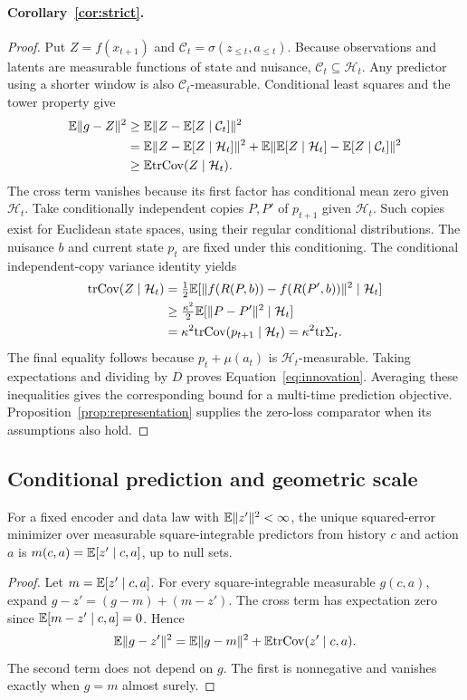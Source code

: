 \paragraph{Corollary~\ref{cor:strict}.}
\begin{proof}
Put $Z=f(x_{t+1})$ and $\mathcal C_t=\sigma(z_{\le t},a_{\le t})$.
Because observations and latents are measurable functions of state and nuisance, $\mathcal C_t\subseteq\mathcal H_t$.
Any predictor using a shorter window is also $\mathcal C_t$-measurable.
Conditional least squares and the tower property give
\begin{align*}
\mathbb{E}\|g-Z\|^2
&\ge\mathbb{E}\|Z-\mathbb{E}[Z\mid\mathcal C_t]\|^2\\
&=\mathbb{E}\|Z-\mathbb{E}[Z\mid\mathcal H_t]\|^2
 +\mathbb{E}\|\mathbb{E}[Z\mid\mathcal H_t]-\mathbb{E}[Z\mid\mathcal C_t]\|^2\\
&\ge\mathbb{E}\mathrm{tr}\mathrm{Cov}(Z\mid\mathcal H_t).
\end{align*}
The cross term vanishes because its first factor has conditional mean zero given $\mathcal H_t$.
Take conditionally independent copies $P,P'$ of $p_{t+1}$ given $\mathcal H_t$.
Such copies exist for Euclidean state spaces, using their regular conditional distributions.
The nuisance $b$ and current state $p_t$ are fixed under this conditioning.
The conditional independent-copy variance identity yields
\begin{align*}
\mathrm{tr}\mathrm{Cov}(Z\mid\mathcal H_t)
&=\tfrac12\mathbb{E}[\|f(R(P,b))-f(R(P',b))\|^2\mid\mathcal H_t]\\
&\ge\tfrac{\kappa^2}{2}\mathbb{E}[\|P-P'\|^2\mid\mathcal H_t]\\
&=\kappa^2\mathrm{tr}\mathrm{Cov}(p_{t+1}\mid\mathcal H_t)
=\kappa^2\mathrm{tr}\Sigma_t.
\end{align*}
The final equality follows because $p_t+\mu(a_t)$ is $\mathcal H_t$-measurable.
Taking expectations and dividing by $D$ proves Equation~\ref{eq:innovation}.
Averaging these inequalities gives the corresponding bound for a multi-time prediction objective.
Proposition~\ref{prop:representation} supplies the zero-loss comparator when its assumptions also hold.
\end{proof}

\subsection{Conditional prediction and geometric scale}
\begin{lemma}
\label{lem:mean}
For a fixed encoder and data law with $\mathbb{E}\|z'\|^2<\infty$, the unique squared-error minimizer
over measurable square-integrable predictors from history $c$ and action $a$ is
$m(c,a)=\mathbb{E}[z'\mid c,a]$, up to null sets.
\end{lemma}
\begin{proof}
Let $m=\mathbb{E}[z'\mid c,a]$.
For every square-integrable measurable $g(c,a)$, expand $g-z'=(g-m)+(m-z')$.
The cross term has expectation zero since $\mathbb{E}[m-z'\mid c,a]=0$.
Hence
\[
\mathbb{E}\|g-z'\|^2=\mathbb{E}\|g-m\|^2+\mathbb{E}\mathrm{tr}\mathrm{Cov}(z'\mid c,a).
\]
The second term does not depend on $g$.
The first is nonnegative and vanishes exactly when $g=m$ almost surely.
\end{proof}


